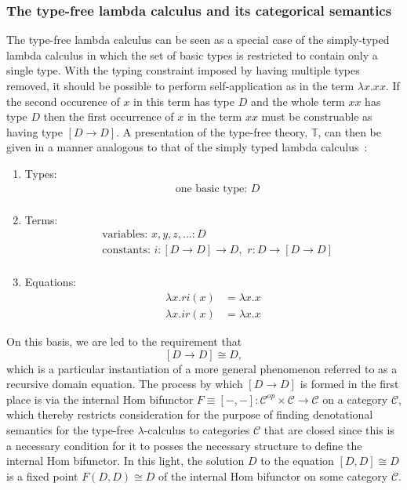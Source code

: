 \subsubsection*{The type-free lambda calculus and its categorical semantics}
The type-free lambda calculus can be seen as a special case of the simply-typed lambda calculus in which the set of basic types is restricted to contain only a single type. With the typing constraint imposed by having multiple types removed, it should be possible to perform self-application as in the term $\lambda x. xx$. If the second occurence of $x$ in this term has type $D$ and the whole term $xx$ has type $D$ then the first occurrence of $x$ in the term $xx$ must be construable as having type $[D \rightarrow D]$. A presentation of the type-free theory, $\mathbb{T}$, can then be given in a manner analogous to that of the simply typed lambda calculus~\cite{Awodey2000}:
\begin{enumerate}
\item{Types:}
\begin{align*}
&\mbox{one basic type: } D\\
\end{align*}
\item{Terms:}
\begin{align*}
&\mbox{variables: } x,y,z, \ldots \colon D\\
&\mbox{constants: } i \colon [D \rightarrow D] \rightarrow D,\,\, r \colon D \rightarrow [D \rightarrow D]\\
\end{align*}
\item{Equations:}
\begin{align*}
            \lambda x. ri(x) &= \lambda x.x\\
            \lambda x. ir(x) &= \lambda x.x
\end{align*}
\end{enumerate}
On this basis, we are led to the requirement that
$$
[D \rightarrow D] \cong D,
$$
which is a particular instantiation of a more general phenomenon referred to as a recursive domain equation. The process by which $[D \rightarrow D]$ is formed in the first place is via the internal Hom bifunctor $F \equiv [-,-] \colon \mathcal{C}^{op} \times \mathcal{C} \rightarrow \mathcal{C}$ on a category $\mathcal{C}$, which thereby restricts consideration for the purpose of finding denotational semantics for the type-free $\lambda$-calculus to categories $\mathcal{C}$ that are closed since this is a necessary condition for it to posses the necessary structure to define the internal Hom bifunctor. In this light, the solution $D$ to the equation $[D,D] \cong D$ is a fixed point $F(D,D) \cong D$ of the internal Hom bifunctor on some category $\mathcal{C}$.

